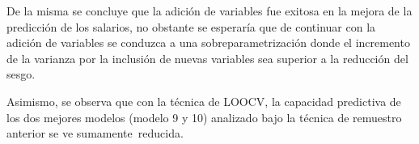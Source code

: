 \documentclass[11pt, a4paper]{article}
\begin{document}
De la misma se concluye que la adición de variables fue exitosa en la mejora de la predicción de los salarios, no obstante se esperaría que de continuar con la adición de variables se conduzca a una sobreparametrización donde el incremento de la varianza por la inclusión de nuevas variables sea superior a la reducción del sesgo. 

Asimismo, se observa que con la técnica de LOOCV, la capacidad predictiva de los dos mejores modelos (modelo 9 y 10) analizado bajo la técnica de remuestro anterior se ve sumamente reducida.
\end{document}
